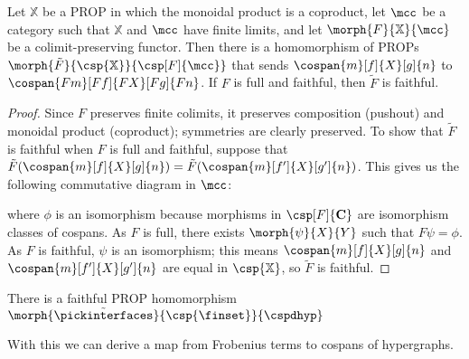 \begin{theorem}
    \label{thm:cospan-homomorphism}
    Let \(\mathbb{X}\) be a PROP in which the monoidal product is a coproduct,
    let \(\mcc\) be a category such that \(\mathbb{X}\) and
    \(\mcc\) have finite limits, and let
    \(\morph{F}{\mathbb{X}}{\mcc}\) be a colimit-preserving functor.
    Then there is a homomorphism of PROPs \(
    \morph{\tilde{F}}{\csp{\mathbb{X}}}{\csp[F]{\mcc}}
    \) that sends \(\cospan{m}[f]{X}[g]{n}\) to
    \(\cospan{Fm}[Ff]{FX}[Fg]{Fn}\).
    If \(F\) is full and faithful, then \(\tilde{F}\) is faithful.
\end{theorem}
\begin{proof}
    Since \(F\) preserves finite colimits, it preserves composition (pushout)
    and monoidal product (coproduct); symmetries are clearly preserved.
    To show that \(\tilde{F}\) is faithful when \(F\) is full and faithful,
    suppose that \(
    \tilde{F}(\cospan{m}[f]{X}[g]{n})
    =
    \tilde{F}(\cospan{m}[f^\prime]{X}[g^\prime]{n})
    \).
    This gives us the following commutative diagram in \(\mcc\):

    \begin{center}
    \end{center}
    where \(\phi\) is an isomorphism because morphisms in
    \(\csp[F]{\mathbf{C}}\) are isomorphism classes of cospans.
    As \(F\) is full, there exists \(\morph{\psi}{X}{Y}\) such that
    \(F\psi = \phi\).
    As \(F\) is faithful, \(\psi\) is an isomorphism; this means
    \(\cospan{m}[f]{X}[g]{n}\) and \(\cospan{m}[f^\prime]{X}[g^\prime]{n}\) are
    equal in \(\csp{\mathbb{X}}\), so \(\tilde{F}\) is faithful.
\end{proof}

\begin{corollary}
    \label{cor:finset-to-hyp}
    There is a faithful PROP homomorphism
    \(\morph{\tilde{\pickinterfaces}}{\csp{\finset}}{\cspdhyp}\)
\end{corollary}

With this we can derive a map from Frobenius terms to cospans of hypergraphs.

